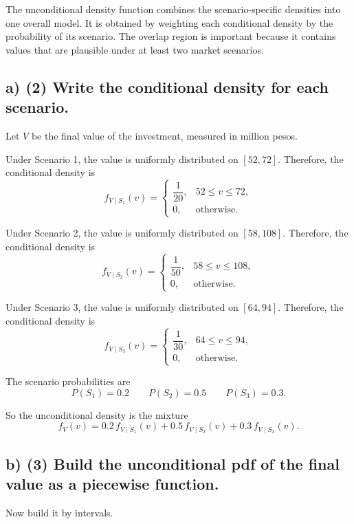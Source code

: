The unconditional density function combines the scenario-specific densities into one overall model. It is obtained by weighting each conditional density by the probability of its scenario. The overlap region is important because it contains values that are plausible under at least two market scenarios.

\subsection*{a) \textbf{(2)} Write the conditional density for each scenario.}
\label{subsec:three-scenario-inventory-investment-c2-a}
Let $V$ be the final value of the investment, measured in million pesos.

Under Scenario 1, the value is uniformly distributed on $[52,72]$. Therefore, the conditional density is
\[
f_{V\mid S_1}(v)=
\begin{cases}
	\dfrac{1}{20}, & 52\le v\le 72,\\[4pt]
	0, & \text{otherwise.}
\end{cases}
\]

Under Scenario 2, the value is uniformly distributed on $[58,108]$. Therefore, the conditional density is
\[
f_{V\mid S_2}(v)=
\begin{cases}
	\dfrac{1}{50}, & 58\le v\le 108,\\[4pt]
	0, & \text{otherwise.}
\end{cases}
\]

Under Scenario 3, the value is uniformly distributed on $[64,94]$. Therefore, the conditional density is
\[
f_{V\mid S_3}(v)=
\begin{cases}
	\dfrac{1}{30}, & 64\le v\le 94,\\[4pt]
	0, & \text{otherwise.}
\end{cases}
\]

The scenario probabilities are
\[
P(S_1)=0.2
\qquad
P(S_2)=0.5
\qquad
P(S_3)=0.3.
\]

So the unconditional density is the mixture
\[
f_V(v)=0.2\,f_{V\mid S_1}(v)+0.5\,f_{V\mid S_2}(v)+0.3\,f_{V\mid S_3}(v).
\]



\subsection*{b) \textbf{(3)} Build the unconditional pdf of the final value as a piecewise function.}
\label{subsec:three-scenario-inventory-investment-c2-b}
Now build it by intervals.


